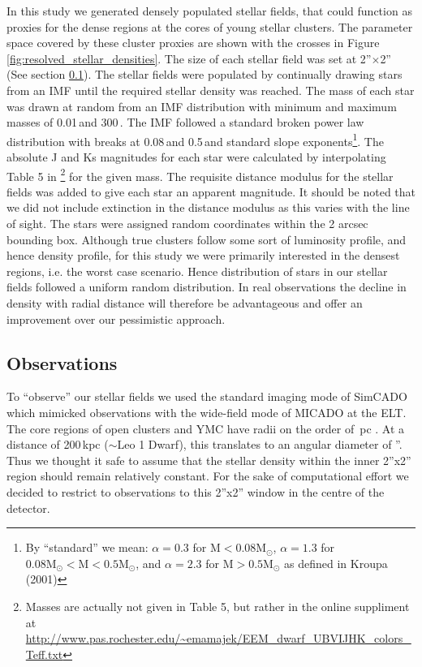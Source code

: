 In this study we generated densely populated stellar fields, that could function as proxies for the dense regions at the cores of young stellar clusters. The parameter space covered by these cluster proxies are shown with the crosses in Figure \ref{fig:resolved_stellar_densities}. The size of each stellar field was set at 2''$\times$2'' (See section \ref{sec:telescope}). The stellar fields were populated by continually drawing stars from an IMF until the required stellar density was reached. The mass of each star was drawn at random from an IMF distribution with minimum and maximum masses of 0.01\,\msun and 300\,\msun. The IMF followed a standard \citet{kroupa2001} broken power law distribution with breaks at 0.08\,\msun and 0.5\,\msun and standard slope exponents\footnote{By ``standard'' we mean: $\alpha=0.3$ for $\mathrm{M} < 0.08 \mathrm{M}_\odot$, $\alpha=1.3$ for $0.08\mathrm{M}_\odot < \mathrm{M} < 0.5 \mathrm{M}_\odot$, and $\alpha=2.3$ for $\mathrm{M} > 0.5 \mathrm{M}_\odot$ as defined in Kroupa (2001)}. The absolute J and Ks magnitudes for each star were calculated by interpolating Table 5 in \citet{pecaut2013}\footnote{Masses are actually not given in Table 5, but rather in the online suppliment at \url{http://www.pas.rochester.edu/~emamajek/EEM_dwarf_UBVIJHK_colors_Teff.txt}} for the given mass. The requisite distance modulus for the stellar fields was added to give each star an apparent magnitude. It should be noted that we did not include extinction in the distance modulus as this varies with the line of sight. The stars were assigned random coordinates within the 2 arcsec bounding box. Although true clusters follow some sort of luminosity profile, and hence density profile, for this study we were primarily interested in the densest regions, i.e. the worst case scenario. Hence distribution of stars in our stellar fields followed a uniform random distribution. In real observations the decline in density with radial distance will therefore be advantageous and offer an improvement over our pessimistic approach.


\subsection{Observations}
\label{sec:telescope}

To ``observe'' our stellar fields we used the standard imaging mode of SimCADO \citep{leschinski2016} which mimicked observations with the wide-field mode of MICADO at the ELT. The core regions of open clusters and YMC have radii on the order of \,pc \citep{portegies2010}. At a distance of 200\,kpc ($\sim$Leo 1 Dwarf), this translates to an angular diameter of ''. Thus we thought it safe to assume that the stellar density within the inner 2''x2'' region should remain relatively constant. For the sake of computational effort we decided to restrict to observations to this 2''x2'' window in the centre of the detector.


